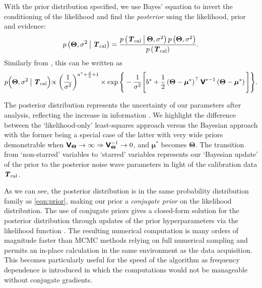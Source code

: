 With the prior distribution specified, we use Bayes' equation to invert the conditioning of the likelihood and find the \textit{posterior} using the likelihood, prior and evidence:
\begin{equation}
    p\left(\boldsymbol{\Theta}, \sigma^2 \given[\big] \y\right) = \frac{p\left(\y \given[\big]  \boldsymbol{\Theta}, \sigma^2\right)p\left(\boldsymbol{\Theta}, \sigma^2\right)}{p\left(\y\right)}.
\end{equation}
Similarly from \citet{banerjee}, this can be written as
\begin{equation}
    \label{eqn:post}
    p\Bigl(\boldsymbol{\Theta},\sigma^2 \given[\big] \y\Bigl) \propto \left(\frac{1}{\sigma^2}\right)^{a^* + \frac{d}{2} + 1} \times \exp{ \Bigg\{ -\frac{1}{\sigma^2} \Bigg[ b^* + \frac{1}{2}\left(\boldsymbol{\Theta} - \boldsymbol{\mu}^*\right)^{\top}\mathbfss{V}^{*-1}\left(\boldsymbol{\Theta} - \boldsymbol{\mu}^*\right) \Bigg] \Bigg\} }.
\end{equation}

The posterior distribution represents the uncertainty of our parameters after analysis, reflecting the increase in information \citep{nagel}. We highlight the difference between the `likelihood-only' least-squares approach versus the Bayesian approach with the former being a special case of the latter with very wide priors demonstrable when $\mathbfss{V}_{\boldsymbol{\Theta}} \rightarrow \infty \Rightarrow \mathbfss{V}_{\boldsymbol{\Theta}}^{-1} \rightarrow 0$, and $\boldsymbol{\mu}^*$ becomes $\boldsymbol{\Theta}$. The transition from `non-starred' variables to `starred' variables represents our `Bayesian update' of the prior to the posterior noise wave parameters in light of the calibration data $\y$.

As we can see, the posterior distribution is in the same probability distribution family as \cref{eqn:prior}, making our prior a \textit{conjugate prior} on the likelihood distribution. The use of conjugate priors gives a closed-form solution for the posterior distribution through updates of the prior hyperparameters via the likelihood function \citep{banerjee, orloff}. The resulting numerical computation is many orders of magnitude faster than MCMC methods relying on full numerical sampling and permits an in-place calculation in the same environment as the data acquisition. This becomes particularly useful for the speed of the algorithm as frequency dependence is introduced in which the computations would not be manageable without conjugate gradients. 

